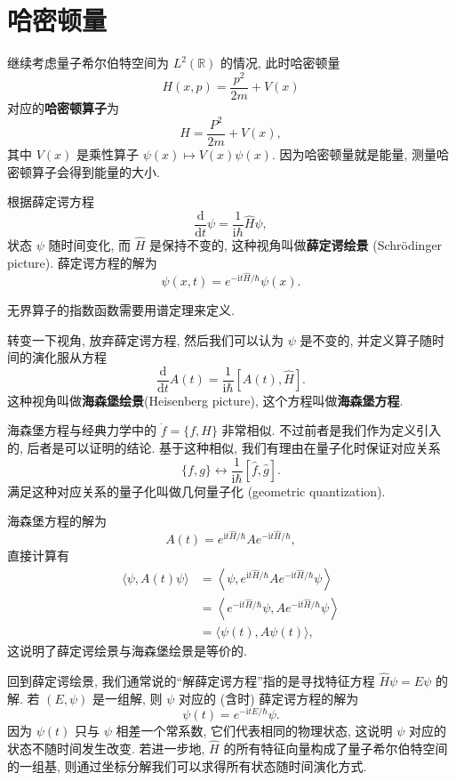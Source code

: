 \section{哈密顿量}
继续考虑量子希尔伯特空间为 $ L^2(\mathbb{R}) $ 的情况, 此时哈密顿量 
\[ H(x,p)=\frac{p^2}{2m}+V(x) \] 
对应的{\bf 哈密顿算子}为
\[ \hat{H}=\frac{P^2}{2m}+V(x), \]
其中 $ V(x) $ 是乘性算子 $ \psi(x)\mapsto V(x)\psi(x) $. 因为哈密顿量就是能量, 测量哈密顿算子会得到能量的大小.

根据薛定谔方程
\[ \frac{\mathrm{d}}{\mathrm{d}t}\psi=\frac{1}{\mathrm{i}\hbar}\hat{H}\psi, \]
状态 $ \psi $ 随时间变化, 而 $ \hat{H} $ 是保持不变的, 这种视角叫做{\bf 薛定谔绘景} (Schr\"{o}dinger picture). 薛定谔方程的解为 
\[ \psi(x,t)=e^{-\mathrm{i}t\hat{H}/\hbar}\psi(x). \]

\begin{remark}
    无界算子的指数函数需要用谱定理来定义.
\end{remark}

转变一下视角, 放弃薛定谔方程, 然后我们可以认为 $ \psi $ 是不变的, 并定义算子随时间的演化服从方程
\[ \frac{\mathrm{d}}{\mathrm{d}t}A(t)=\frac{1}{\mathrm{i}\hbar}[A(t),\hat{H}]. \]
这种视角叫做{\bf 海森堡绘景}(Heisenberg picture), 这个方程叫做{\bf 海森堡方程}. 

\begin{remark}
    海森堡方程与经典力学中的 $ \dot{f}=\{f,H\} $ 非常相似. 不过前者是我们作为定义引入的, 后者是可以证明的结论. 基于这种相似, 我们有理由在量子化时保证对应关系
    \[ \{f,g\}\longleftrightarrow \frac{1}{\mathrm{i}\hbar}[\hat{f},\hat{g}]. \] 
    满足这种对应关系的量子化叫做几何量子化 (geometric quantization).
\end{remark}

海森堡方程的解为
\[ A(t)=e^{\mathrm{i}t\hat{H}/\hbar}Ae^{-\mathrm{i}t\hat{H}/\hbar}, \]
直接计算有
\begin{align*}
    \langle \psi,A(t)\psi\rangle &= \left\langle \psi,e^{\mathrm{i}t\hat{H}/\hbar}Ae^{-\mathrm{i}t\hat{H}/\hbar}\psi \right\rangle\\ 
    &= \left\langle e^{-\mathrm{i}t\hat{H}/\hbar}\psi ,Ae^{-\mathrm{i}t\hat{H}/\hbar}\psi  \right\rangle\\ 
    &= \langle \psi(t), A\psi(t)\rangle,
\end{align*}
这说明了薛定谔绘景与海森堡绘景是等价的.

回到薛定谔绘景, 我们通常说的``解薛定谔方程''指的是寻找特征方程 $ \hat{H}\psi=E\psi $ 的解. 若 $ (E,\psi) $ 是一组解, 则 $ \psi $ 对应的 (含时) 薛定谔方程的解为
\[ \psi(t)=e^{-\mathrm{i}tE/\hbar}\psi. \]
因为 $ \psi(t) $ 只与 $ \psi $ 相差一个常系数, 它们代表相同的物理状态, 这说明 $ \psi $ 对应的状态不随时间发生改变. 若进一步地, $ \hat{H} $ 的所有特征向量构成了量子希尔伯特空间的一组基, 则通过坐标分解我们可以求得所有状态随时间演化方式.

